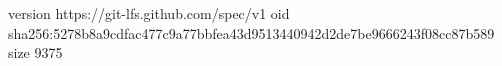 version https://git-lfs.github.com/spec/v1
oid sha256:5278b8a9cdfac477c9a77bbfea43d9513440942d2de7be9666243f08cc87b589
size 9375
